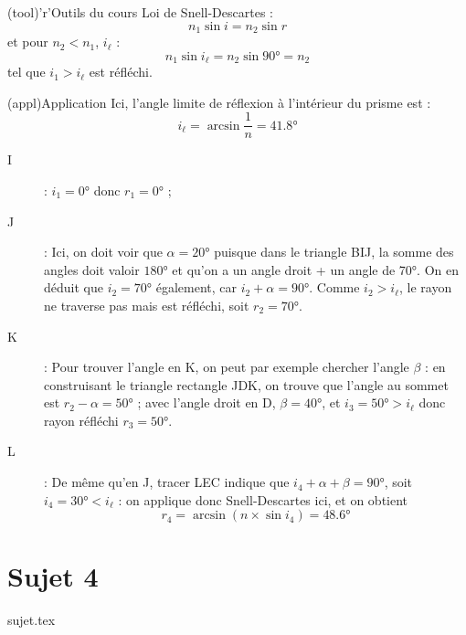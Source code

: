 \documentclass[a4paper, 11pt]{book}
\begin{document}
{\begin{tcbraster}[raster columns=3, raster equal height=rows]
\begin{tcolorbox}[blankest, raster multicolumn=1, space to=\myspace]
\begin{tcbraster}[raster columns=1]
				\begin{tcb}(tool)'r'{Outils du cours}
					Loi de Snell-Descartes :
					\[ n_1\sin i = n_2\sin r\]
					et pour $n_2 < n_1$, $i_\ell$ :
					\[ n_1\sin i_\ell = n_2\sin \ang{90;;} = n_2\]
					tel que $i_1 > i_\ell$ est réfléchi.
				\end{tcb}
			\end{tcbraster}
		\end{tcolorbox}
	\end{tcbraster}
	\begin{tcb}[sidebyside](appl){Application}
		Ici, l'angle limite de réflexion à l'intérieur du prisme est : \[i_\ell =
			\arcsin \frac{1}{n} = \boxed{ \ang{41.8;;}}\]
		\begin{description}
			\item[I] : $$ donc
				$$ ;
			\item[J] : Ici, on doit voir que $\alpha = \ang{20;;}$ puisque
				dans le triangle BIJ, la somme des angles doit valoir $\ang{180;;}$
				et qu'on a un angle droit + un angle de \ang{70;;}.
				On en déduit que $$ également, car
				$i_2 + \alpha = \ang{90;;}$.\smallbreak
				Comme \underline{$i_2 > i_\ell$}, le rayon ne traverse pas mais est
				réfléchi, soit $$.
		\end{description}
		\tcblower
		\begin{description}
			\item[K] : Pour trouver l'angle en K, on peut par exemple chercher
				l'angle $\beta$ : en construisant le triangle rectangle JDK, on
				trouve que l'angle au sommet est $r_2 - \alpha = \ang{50;;}$ ;
				avec l'angle droit en D, $\beta = \ang{40;;}$, et $$ donc rayon réfléchi $$.
			\item[L] : De même qu'en J, tracer LEC indique que $i_4 + \alpha + \beta
					= \ang{90;;}$, soit $$
				: on applique donc Snell-Descartes ici, et on obtient
				\[\boxed{r_4} = \arcsin (n\times \sin i_4) =
					\boxed{\ang{48.6;;}}\]
		\end{description}
	\end{tcb}

}

\resetQ
\newpage

\chapter{Sujet 4}
{sujet.tex}
\end{document}
